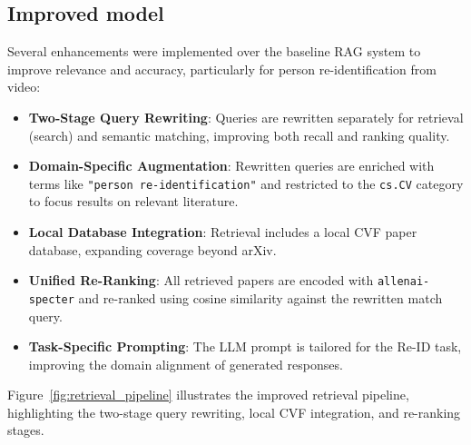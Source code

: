 \documentclass[fleqn,moreauthors,10pt]{ds_report}
\begin{document}
  \subsection*{Improved model}

Several enhancements were implemented over the baseline RAG system to 
improve relevance and accuracy, particularly for person re-identification
 from video:

\begin{itemize}
    \item \textbf{Two-Stage Query Rewriting}: Queries are rewritten separately for retrieval (search) and semantic matching, improving both recall and ranking quality.
    
    \item \textbf{Domain-Specific Augmentation}: Rewritten queries are enriched with terms like \texttt{"person re-identification"} and restricted to the \texttt{cs.CV} category to focus results on relevant literature.

    \item \textbf{Local Database Integration}: Retrieval includes a local CVF paper database, expanding coverage beyond arXiv.

    \item \textbf{Unified Re-Ranking}: All retrieved papers are encoded with \texttt{allenai-specter} and re-ranked using cosine similarity against the rewritten match query.

    \item \textbf{Task-Specific Prompting}: The LLM prompt is tailored for the Re-ID task, improving the domain alignment of generated responses.
\end{itemize}

Figure~\ref{fig:retrieval_pipeline} illustrates the improved retrieval pipeline, highlighting the two-stage query rewriting, local CVF integration, and re-ranking stages.
\end{document}
